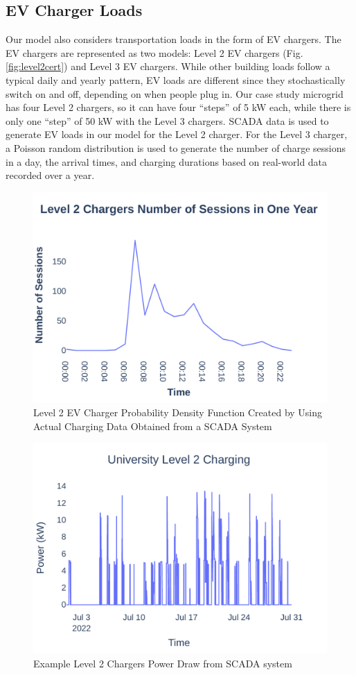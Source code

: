\documentclass[conference, usletter]{IEEEtran}
\begin{document}
\subsection{EV Charger Loads }
Our model also considers transportation loads in the form of EV chargers. The EV chargers are represented as two models: Level 2 EV chargers (Fig. \ref{fig:level2cert}) and Level 3 EV chargers. While other building loads follow a typical daily and yearly pattern, EV loads are different since they stochastically switch on and off, depending on when people plug in. Our case study microgrid has four Level 2 chargers, so it can have four ``steps'' of 5 kW each, while there is only one ``step'' of 50 kW with the Level 3 chargers. SCADA data is used to generate EV loads in our model for the Level 2 charger. For the Level 3 charger, a Poisson random distribution is used to generate the number of charge sessions in a day, the arrival times, and charging durations based on real-world data recorded over a year. 
\begin{figure}
\centering
\includegraphics[width=0.9\linewidth]{Fig/Option_3/l2_avg_day_rand_poisson_1_hour_real.pdf}
\caption{\footnotesize Level 2 EV Charger Probability Density Function  Created  by Using Actual Charging Data Obtained from a SCADA System}
\label{fig:l2avgdayrandpoisson1hourpdf}
\end{figure}
\begin{figure}
\centering
\includegraphics[width=0.9\linewidth]{Fig/Option_3/L2_short.pdf}
\caption{\footnotesize Example Level 2 Chargers Power Draw from SCADA system}
\label{fig:l2short}
\end{figure}
\end{document}
